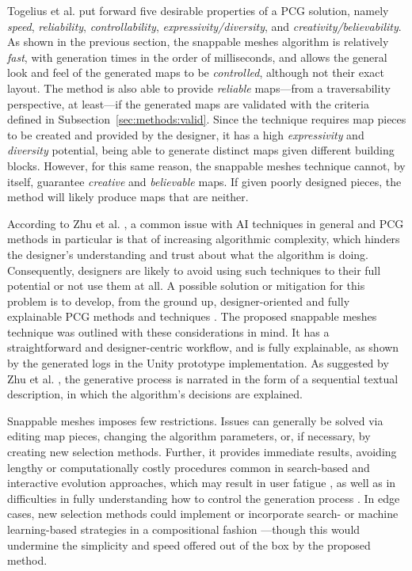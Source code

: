 \documentclass[journal]{IEEEtran}
\begin{document}
Togelius et al. \cite{togelius2016intro} put forward five desirable properties of a PCG
solution, namely \textit{speed}, \textit{reliability}, \textit{controllability},
\textit{expressivity/diversity}, and \textit{creativity/believability}. As shown in the
previous section, the snappable meshes algorithm is relatively \textit{fast}, with
generation times in the order of milliseconds, and allows the general look and feel of
the generated maps to be \textit{controlled}, although not their exact layout.
The method is also able to provide \textit{reliable} maps---from a
traversability perspective, at least---if the generated maps are validated with the
criteria defined in Subsection~\ref{sec:methods:valid}. Since the technique requires map
pieces to be created and provided by the designer, it has a high \textit{expressivity} and
\textit{diversity} potential, being able to generate distinct maps given different building
blocks. However, for this same reason, the snappable meshes technique cannot, by itself,
guarantee \textit{creative} and \textit{believable} maps. If given poorly designed pieces,
the method will likely produce maps that are neither.

According to Zhu et al. \cite{zhu2018explainable}, a common issue with AI techniques in
general and PCG methods in particular is that of increasing algorithmic complexity,
which hinders the designer's understanding and trust about what the algorithm is doing.
Consequently, designers are likely to avoid using such techniques to their full potential
or not use them at all. A possible solution or mitigation for this problem is to develop,
from the ground up, designer-oriented and fully explainable PCG methods and techniques
\cite{zhu2018explainable}. The proposed snappable meshes technique was outlined with these
considerations in mind. It has a straightforward and designer-centric workflow, and is
fully explainable, as shown by the generated logs in the Unity prototype implementation.
As suggested by Zhu et al. \cite{zhu2018explainable}, the generative process is narrated
in the form of a sequential textual description, in which the algorithm's decisions are
explained.

Snappable meshes imposes few restrictions. Issues can generally be solved via editing
map pieces, changing the algorithm parameters, or, if necessary, by creating new selection
methods. Further, it provides immediate results, avoiding lengthy or computationally costly
procedures common in search-based \cite{togelius2011search} and interactive evolution
approaches, which may result in user fatigue \cite{liapis2016mixed}, as well as in
difficulties in fully understanding how to control the generation process
\cite{zhu2018explainable,baldwin2017towards,almeida2013systematic}. In edge cases, new
selection methods could implement or incorporate search- or machine learning-based
strategies in a compositional fashion \cite{togelius2012compositional}---though this would
undermine the simplicity and speed offered out of the box by the proposed method.
\end{document}

